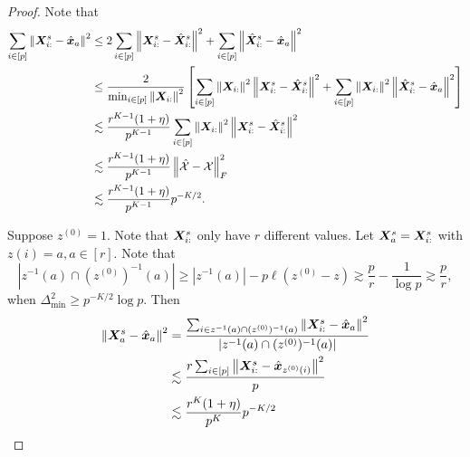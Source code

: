 \documentclass[lettersize,journal]{IEEEtran}
\theoremstyle{definition}
\theoremstyle{definition}
\newcommand{\off}[1]{\left[#1\right]}
\begin{document}
\begin{proof}
Note that 
\begin{align}
     \sum_{i \in [p]} \onorm{\mX_{i:}^s - \hat \mx_a}^2 &\leq  2\sum_{i \in [p]} \onorm{\mX_{i:}^s - \hat \mX_{i:}^s}^2 + \sum_{i \in [p]} \onorm{\hat \mX_{i:}^s - \hat \mx_a }^2 \\
    & \leq \frac{2}{\min_{i \in [p]} \onorm{\mX_{i:}}^2}  \off{ \sum_{i \in [p]} \onorm{\mX_{i:}}^2  \onorm{\mX_{i:}^s - \hat \mX_{i:}^s}^2 +  \sum_{i \in [p]}  \onorm{\mX_{i:}}^2  \onorm{\hat \mX_{i:}^s - \hat \mx_a }^2 }\\
    & \lesssim \frac{r^{K-1} (1 + \eta)}{p^{K-1}} \sum_{i \in [p]} \onorm{\mX_{i:}}^2  \onorm{\mX_{i:}^s - \hat \mX_{i:}^s}^2 \\
    & \lesssim  \frac{r^{K-1} (1 + \eta)}{p^{K-1}}  \onorm{\hat  \tX - \tX}_F^2 \\
    & \lesssim \frac{r^{K-1} (1 + \eta)}{p^{K-1}} p^{-K/2}.
\end{align}

Suppose $z^{(0)} = 1$.  Note that $\bm X^s_{i:}$ only have $r$ different values. Let $\bm X_{a}^s = \bm X^s_{i:}$ with $z(i) = a, a \in [r]$. Note that 
\begin{equation}
    |z^{-1}(a) \cap (z^{(0)})^{-1} (a)| \geq |z^{-1}(a)| - p\ell(z^{(0)} - z) \gtrsim \frac{p}{r} - \frac{1}{\log p} \gtrsim \frac{p}{r},
\end{equation}
when $\Delta_{\min}^2 \geq p^{-K/2} \log p$. Then
\begin{align}
    \left\lVert\bm X_a^s - \hat {\bm x}_a\right\rVert^2 &= \frac{ \sum_{i \in z^{-1}(a) \cap (z^{(0)})^{-1} (a) } \left\lVert \bm X_{i:}^s - \hat {\bm x}_a\right\rVert^2 }{|z^{-1}(a) \cap (z^{(0)})^{-1} (a) |} \\
    & \lesssim \frac{ r \sum_{i \in [p]} \left\lVert\bm X_{i:}^s - \hat {\bm x}_{z^{(0)}(i)}\right\rVert^2 }{ p}\\
    & \lesssim \frac{r^K(1 + \eta)}{p^{K}} p^{-K/2} 
\end{align}


\end{proof}
\end{document}
